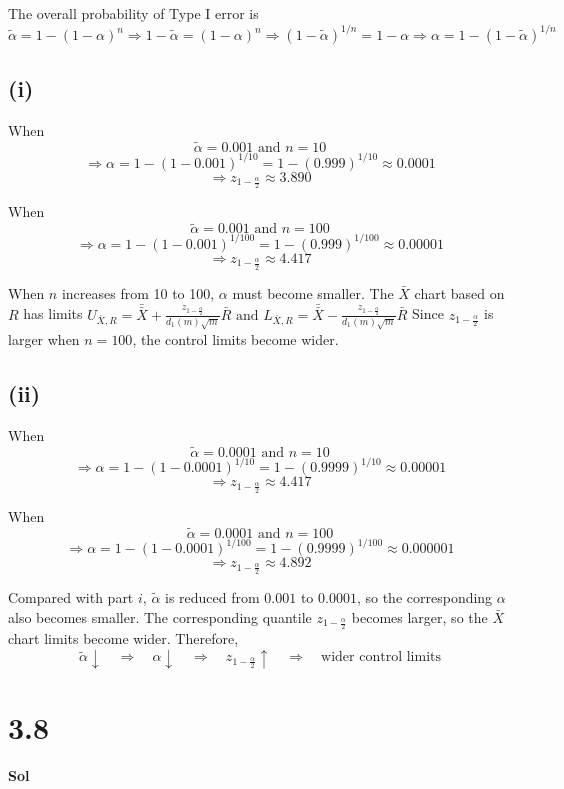 \documentclass[a4paper, 12pt]{article}  %
\begin{document}
The overall probability of Type I error is
$$
\tilde{\alpha}=1-(1-\alpha)^n
\Rightarrow
1-\tilde{\alpha}=(1-\alpha)^n
\Rightarrow
(1-\tilde{\alpha})^{1/n}=1-\alpha
\Rightarrow
\alpha=1-(1-\tilde{\alpha})^{1/n}
$$

\subsection*{(i)}

When
$$
\tilde{\alpha}=0.001
\text{ and }
n=10
$$
$$
\Rightarrow \alpha=1-(1-0.001)^{1/10}=1-(0.999)^{1/10}\approx 0.0001
$$
$$
\Rightarrow z_{1-\frac{\alpha}{2}}\approx 3.890
$$

When
$$
\tilde{\alpha}=0.001
\text{ and }
n=100
$$
$$\Rightarrow \alpha=1-(1-0.001)^{1/100}=1-(0.999)^{1/100}\approx 0.00001
$$
$$
\Rightarrow z_{1-\frac{\alpha}{2}}\approx 4.417
$$

When $n$ increases from 10 to 100, $\alpha$ must become smaller.
The \(\bar X\) chart based on \(R\) has limits
$
U_{\bar X,R}=\bar{\bar X}+\frac{z_{1-\frac{\alpha}{2}}}{d_1(m)\sqrt m}\bar R
\text{ and }
L_{\bar X,R}=\bar{\bar X}-\frac{z_{1-\frac{\alpha}{2}}}{d_1(m)\sqrt m}\bar R
$
Since $z_{1-\frac{\alpha}{2}}$ is larger when $n=100$, the control limits become wider.

\subsection*{(ii)}

When
$$
\tilde{\alpha}=0.0001
\text{ and }
n=10
$$
$$
\Rightarrow \alpha=1-(1-0.0001)^{1/10}=1-(0.9999)^{1/10}\approx 0.00001
$$
$$
\Rightarrow z_{1-\frac{\alpha}{2}}\approx 4.417
$$

When
$$
\tilde{\alpha}=0.0001
\text{ and }
n=100
$$
$$
\Rightarrow \alpha=1-(1-0.0001)^{1/100}=1-(0.9999)^{1/100}\approx 0.000001
$$
$$
\Rightarrow z_{1-\frac{\alpha}{2}}\approx 4.892
$$

Compared with part \(i\), 
$\tilde{\alpha}$ is reduced from $0.001$ to $0.0001$, 
so the corresponding $\alpha$ also becomes smaller.
The corresponding quantile $z_{1-\frac{\alpha}{2}}$ becomes larger,
so the \(\bar X\) chart limits become wider.
Therefore,
$$
\tilde{\alpha}\downarrow
\quad\Rightarrow\quad
\alpha\downarrow
\quad\Rightarrow\quad
z_{1-\frac{\alpha}{2}}\uparrow
\quad\Rightarrow\quad
\text{wider control limits}
$$

\section*{3.8}
\textbf{Sol}
\end{document}
